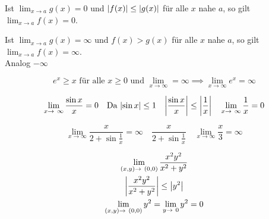 \begin{def*}[note = Majorantenkriterium , index = Majorantenkriterium]
	Ist $\lim_{x \rightarrow a} g(x) = 0$ und $\abs{f(x)} \leq \abs{g(x)}$ für alle $x$ nahe $a$, so gilt $\lim_{x \rightarrow a} f(x) = 0$.
\end{def*}
\begin{def*}[note = Minorantenkriterium , index = Majorantenkriterium]
	Ist $\lim_{x \rightarrow a} g(x) = \infty$ und $f(x) > g(x)$ für alle $x$ nahe $a$, so gilt $\lim_{x \rightarrow a} f(x) = \infty$. \\
	Analog $-\infty$
\end{def*}
\begin{bsp*}
	\[ e^x \geq x \text{ für alle } x \geq 0 \text{ und } \lim_{x \rightarrow \infty} = \infty \implies \lim_{x \rightarrow \infty} e^x = \infty \]
\end{bsp*}
\begin{bsp*}
	\[ \lim_{x \rightarrow \infty} \frac{\sin x}{x} = 0 \quad \text{Da } \abs{\sin x} \leq 1 \quad \abs{\frac{\sin x}{x}} \leq \abs{\frac{1}{x}} \quad \lim_{x \rightarrow \infty} \frac{1}{x} = 0 \]
\end{bsp*}
\begin{bsp*}
	\[ \lim_{x \rightarrow \infty} \frac{x}{2 + \sin \frac{1}{x}} = \infty \quad \frac{x}{2 + \sin \frac{1}{x}} \quad \lim_{x \rightarrow \infty} \frac{x}{3} = \infty \]
\end{bsp*}
\begin{bsp*}
	\begin{gather*}
		\lim_{(x,y) \rightarrow (0,0)} \frac{x^2 y^2}{x^2 + y^2} \\
		\abs{\frac{x^2 y^2}{x^2 + y^2}} \leq \abs{y^2} \\
		\lim_{(x,y) \rightarrow (0,0)} y^2 = \lim_{y \rightarrow 0} y^2 = 0
	\end{gather*}
\end{bsp*}

